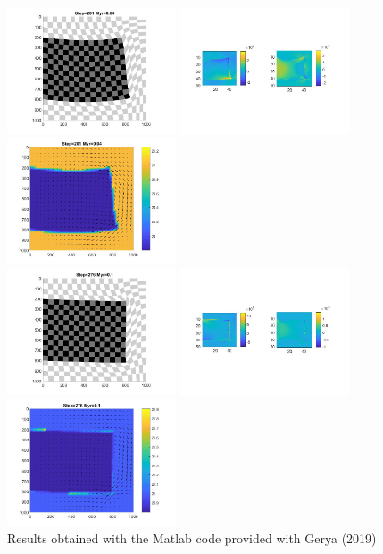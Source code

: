 \begin{center}
\includegraphics[width=5cm]{python_codes/fieldstone_64/results/slab/gerya2/markers_0040_Myr}
\includegraphics[width=5cm]{python_codes/fieldstone_64/results/slab/gerya2/stress_0040_Myr}
\includegraphics[width=5cm]{python_codes/fieldstone_64/results/slab/gerya2/velocity_0040_Myr}\\
\includegraphics[width=5cm]{python_codes/fieldstone_64/results/slab/gerya2/markers_0100_Myr}
\includegraphics[width=5cm]{python_codes/fieldstone_64/results/slab/gerya2/stress_0100_Myr}
\includegraphics[width=5cm]{python_codes/fieldstone_64/results/slab/gerya2/velocity_0100_Myr}\\
{\captionfont Results obtained with the Matlab code provided with Gerya (2019) \cite{gery19book}}
\end{center}

